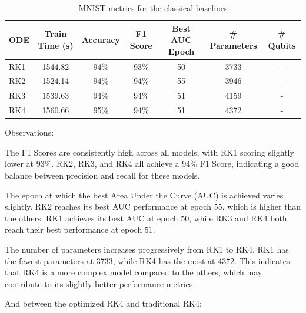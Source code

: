 \documentclass[12pt,a4paper]{report}
\begin{document}
\begin{table}[th]\small\linespread{1}
  \label{tab:classical_MNIST_0}
  \centering
  \begin{tabular}{|l|c|c|c|c|c|c|}
    \hline
    \textbf{ODE} & \textbf{Train Time (s)} & \textbf{Accuracy} & \textbf{F1 Score} & \textbf{Best AUC Epoch} & \textbf{\# Parameters} & \textbf{\# Qubits} \\
    \hline
    RK1          & 1544.82                 & 94\%              & 93\%              & 50                      & 3733                   & -                  \\
    RK2          & 1524.14                 & 94\%              & 94\%              & 55                      & 3946                   & -                  \\
    RK3          & 1539.63                 & 94\%              & 94\%              & 51                      & 4159                   & -                  \\
    RK4          & 1560.66                 & 95\%              & 94\%              & 51                      & 4372                   & -                  \\
    \hline
  \end{tabular}
  \caption{MNIST metrics for the classical baselines}
\end{table}

Observations:

The F1 Scores are consistently high across all models, with RK1 scoring slightly lower at 93\%. RK2, RK3, and RK4 all achieve a 94\% F1 Score, indicating a good balance between precision and recall for these models.

The epoch at which the best Area Under the Curve (AUC) is achieved varies slightly. RK2 reaches its best AUC performance at epoch 55, which is higher than the others. RK1 achieves its best AUC at epoch 50, while RK3 and RK4 both reach their best performance at epoch 51.

The number of parameters increases progressively from RK1 to RK4. RK1 has the fewest parameters at 3733, while RK4 has the most at 4372. This indicates that RK4 is a more complex model compared to the others, which may contribute to its slightly better performance metrics.

\clearpage

And between the optimized RK4 and traditional RK4:
\end{document}
